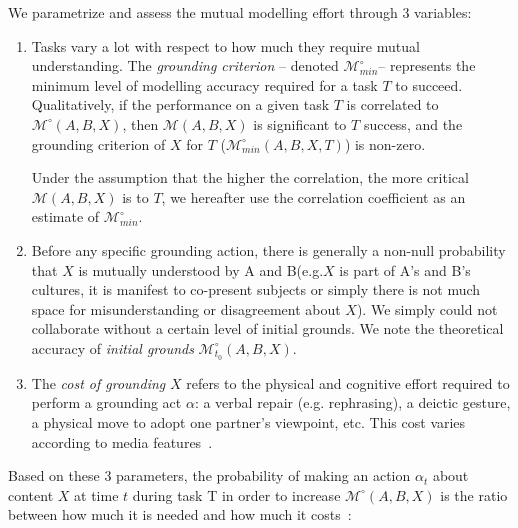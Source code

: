 \documentclass[natbib]{svjour3}
\newcommand{\eg}{e.g.\xspace}
\newcommand{\A}{A\xspace}
\newcommand{\B}{B\xspace}
\newcommand{\model}[3]{{$\mathcal{M}(#1, #2, #3)$}}
\newcommand{\Model}[3]{{$\mathcal{M}^{\circ}(#1, #2, #3)$}}
\newcommand{\groundingcriterion}{{$\mathcal{M}^{\circ}_{min}$}}
\begin{document}
We parametrize and assess the mutual modelling effort through 3 variables:

\begin{enumerate}

    \item Tasks vary a lot with respect to how much they require mutual
        understanding.  The \emph{grounding criterion} -- denoted
        \groundingcriterion -- represents the minimum level of modelling
        accuracy required for a task $T$ to succeed. Qualitatively, if the
        performance on a given task $T$ is correlated to \Model{A}{B}{X}, then
        \model{A}{B}{X} is significant to $T$ success, and the
        grounding criterion of $X$ for $T$
        ($\mathcal{M}^{\circ}_{min}(A,B,X,T)$) is non-zero.

        Under the assumption that the higher the correlation, the more
        critical \model{A}{B}{X} is to $T$, we hereafter use the correlation
        coefficient as an estimate of \groundingcriterion.
        \vspace{1em}

    \item Before any specific grounding action, there is generally a non-null
        probability that $X$ is mutually understood by \A and \B (\eg $X$ is
        part of \A's and \B's cultures, it is manifest to co-present subjects
        or simply there is not much space for misunderstanding or disagreement
        about $X$). We simply could not collaborate without a certain level of
        initial grounds. We note the theoretical accuracy of \emph{initial
        grounds} $\mathcal{M}^{\circ}_{t_0}(A,B,X)$.
        \vspace{1em}

    \item The \emph{cost of grounding} $X$ refers to the physical and cognitive
        effort required to perform a grounding act $\alpha$: a verbal repair
        (\eg rephrasing), a deictic gesture, a physical move to adopt one
        partner's viewpoint, etc. This cost varies according to media
        features~\citep{clark1991grounding}.

\end{enumerate}

Based on these 3 parameters, the probability of making an action $\alpha_{t}$
about content $X$ at time $t$ during task T in order to increase \Model{A}{B}{X}
is the ratio between how much it is needed and how much it
costs~\citep{traum1996miscommunication}:
\end{document}
